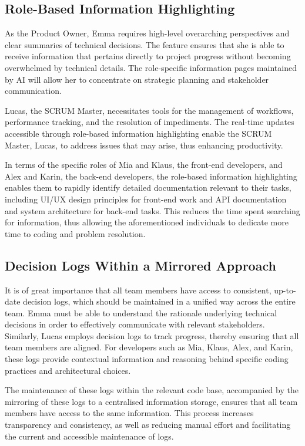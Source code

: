 \subsection*{Role-Based Information Highlighting}
As the Product Owner, Emma requires high-level overarching perspectives and clear summaries of technical decisions. The feature ensures that she is able to receive information that pertains directly to project progress without becoming overwhelmed by technical details. The role-specific information pages maintained by \ac{AI} will allow her to concentrate on strategic planning and stakeholder communication.

Lucas, the \ac{SCRUM} Master, necessitates tools for the management of workflows, performance tracking, and the resolution of impediments. The real-time updates accessible through role-based information highlighting enable the \ac{SCRUM} Master, Lucas, to address issues that may arise, thus enhancing productivity.

In terms of the specific roles of Mia and Klaus, the front-end developers, and Alex and Karin, the back-end developers, the role-based information highlighting enables them to rapidly identify detailed documentation relevant to their tasks, including \ac{UI}/\ac{UX} design principles for front-end work and \ac{API} documentation and system architecture for back-end tasks. This reduces the time spent searching for information, thus allowing the aforementioned individuals to dedicate more time to coding and problem resolution.

\subsection*{Decision Logs Within a Mirrored Approach}
It is of great importance that all team members have access to consistent, up-to-date decision logs, which should be maintained in a unified way across the entire team. Emma must be able to understand the rationale underlying technical decisions in order to effectively communicate with relevant stakeholders. Similarly, Lucas employs decision logs to track progress, thereby ensuring that all team members are aligned. For developers such as Mia, Klaus, Alex, and Karin, these logs provide contextual information and reasoning behind specific coding practices and architectural choices.

The maintenance of these logs within the relevant code base, accompanied by the mirroring of these logs to a centralised information storage, ensures that all team members have access to the same information. This process increases transparency and consistency, as well as reducing manual effort and facilitating the current and accessible maintenance of logs.

